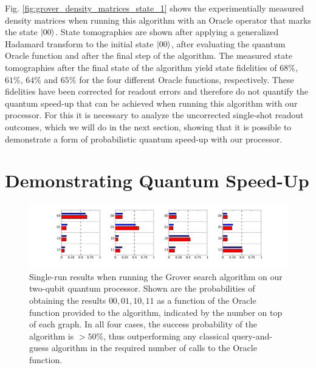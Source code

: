 Fig. \ref{fig:grover_density_matrices_state_1} shows the experimentially measured density matrices when running this algorithm with an Oracle operator that marks the state $\left| 00 \right>$. State tomographies are shown after applying a generalized Hadamard transform to the initial state $\left| 00 \right>$, after evaluating the quantum Oracle function and after the final step of the algorithm. The measured state tomographies after the final state of the algorithm yield state fidelities of $68 \%$, $61 \%$, $64 \%$ and $65 \%$ for the four different Oracle functions, respectively. These fidelities have been corrected for readout errors and therefore do not quantify the quantum speed-up that can be achieved when running this algorithm with our processor. For this it is necessary to analyze the uncorrected single-shot readout outcomes, which we will do in the next section, showing that it is possible to demonstrate a form of probabilistic quantum speed-up with our processor.

\section{Demonstrating Quantum Speed-Up}

\begin{figure}[ht!]
		\centering
		\includegraphics[width=1.0\textwidth]{"./data/ct5/2011_04_21 - grover and tomo/good_data/grover algorithm - single run probabilities"}
	\caption[Single-run results of the Grover search algorithm]{Single-run results when running the Grover search algorithm on our two-qubit quantum processor. Shown are the probabilities of obtaining the results $00,01,10,11$ as a function of the Oracle function provided to the algorithm, indicated by the number on top of each graph. In all four cases, the success probability of the algorithm is $> 50 \%$, thus outperforming any classical query-and-guess algorithm in the required number of calls to the Oracle function.}
	\label{fig:grover_single_shot_probabilities}
\end{figure}

